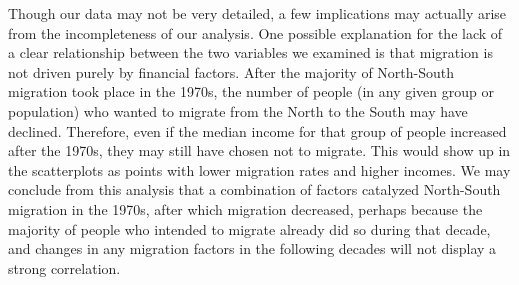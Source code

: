 \documentclass[12pt]{article}
\begin{document}
Though our data may not be very detailed, a few implications may actually arise from the incompleteness of our analysis. One possible explanation for the lack of a clear relationship between the two variables we examined is that migration is not driven purely by financial factors. After the majority of North-South migration took place in the 1970s, the number of people (in any given group or population) who wanted to migrate from the North to the South may have declined. Therefore, even if the median income for that group of people increased after the 1970s, they may still have chosen not to migrate. This would show up in the scatterplots as points with lower migration rates and higher incomes. We may conclude from this analysis that a combination of factors catalyzed North-South migration in the 1970s, after which migration decreased, perhaps because the majority of people who intended to migrate already did so during that decade, and changes in any migration factors in the following decades will not display a strong correlation.
\end{document}
